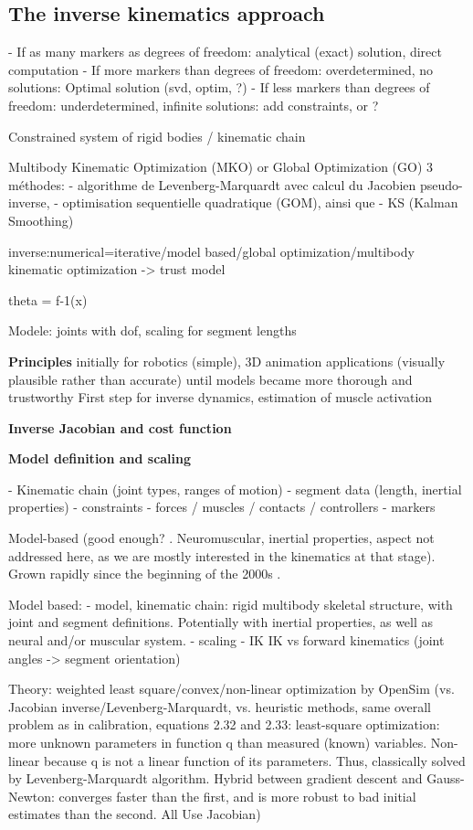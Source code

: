 \newpage
\subsection{The inverse kinematics approach}

- If as many markers as degrees of freedom: analytical (exact) solution, direct computation
- If more markers than degrees of freedom: overdetermined, no solutions: Optimal solution (svd, optim, ?)
- If less markers than degrees of freedom: underdetermined, infinite solutions: add constraints, or ?

Constrained system of rigid bodies / kinematic chain

Multibody Kinematic Optimization (MKO) or Global Optimization (GO)
3 méthodes: 
- algorithme de Levenberg-Marquardt avec calcul du Jacobien pseudo-inverse, 
- optimisation sequentielle quadratique (GOM), ainsi que 
- KS (Kalman Smoothing)

inverse:numerical=iterative/model based/global optimization/multibody kinematic optimization
-> trust model

theta = f-1(x)


Modele: joints with dof, scaling for segment lengths


\textbf{Principles}
initially for robotics (simple), 3D animation applications (visually plausible rather than accurate) until models became more thorough and trustworthy
First step for inverse dynamics, estimation of muscle activation 

\textbf{Inverse Jacobian and cost function}

\textbf{Model definition and scaling}

- Kinematic chain (joint types, ranges of motion) 
- segment data (length, inertial properties)
- constraints
- forces / muscles / contacts / controllers
- markers


Model-based (good enough? \cite{Hicks2015}. Neuromuscular, inertial properties, aspect not addressed here, as we are mostly interested in the kinematics at that stage).
Grown rapidly since the beginning of the 2000s \cite{Hicks2015}.

Model based:
- model, kinematic chain: rigid multibody skeletal structure, with joint and segment definitions. Potentially with inertial properties, as well as neural and/or muscular system.
- scaling
- IK
IK vs forward kinematics (joint angles -> segment orientation)


Theory: weighted least square/convex/non-linear optimization by OpenSim (vs. Jacobian inverse/Levenberg-Marquardt, vs. heuristic methods, same overall problem as in calibration, equations 2.32 and 2.33: least-square optimization: more unknown parameters in function q than measured (known) variables. Non-linear because q is not a linear function of its parameters. Thus, classically solved by Levenberg-Marquardt algorithm. Hybrid between gradient descent and Gauss-Newton: converges faster than the first, and is more robust to bad initial estimates than the second. All Use Jacobian)


